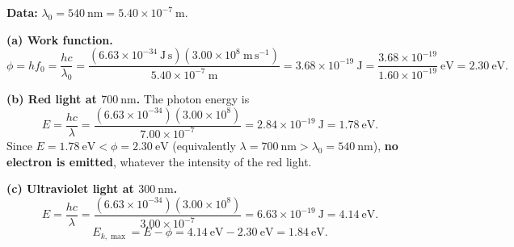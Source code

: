 \documentclass[11pt]{article}
\begin{document}
\begin{corrige}
\textbf{Data:} $\lambda_0 = 540\ \mathrm{nm} = 5.40\times 10^{-7}\ \mathrm{m}$.

\textbf{(a) Work function.}
\[ \phi = hf_0 = \frac{hc}{\lambda_0} = \frac{(6.63\times 10^{-34}\ \mathrm{J\,s})(3.00\times 10^{8}\ \mathrm{m\,s^{-1}})}{5.40\times 10^{-7}\ \mathrm{m}} = 3.68\times 10^{-19}\ \mathrm{J} = \frac{3.68\times 10^{-19}}{1.60\times 10^{-19}}\ \mathrm{eV} = 2.30\ \mathrm{eV}. \]

\textbf{(b) Red light at $700\ \mathrm{nm}$.} The photon energy is
\[ E = \frac{hc}{\lambda} = \frac{(6.63\times 10^{-34})(3.00\times 10^{8})}{7.00\times 10^{-7}} = 2.84\times 10^{-19}\ \mathrm{J} = 1.78\ \mathrm{eV}. \]
Since $E = 1.78\ \mathrm{eV} < \phi = 2.30\ \mathrm{eV}$ (equivalently $\lambda = 700\ \mathrm{nm} > \lambda_0 = 540\ \mathrm{nm}$), \textbf{no electron is emitted}, whatever the intensity of the red light.

\textbf{(c) Ultraviolet light at $300\ \mathrm{nm}$.}
\[ E = \frac{hc}{\lambda} = \frac{(6.63\times 10^{-34})(3.00\times 10^{8})}{3.00\times 10^{-7}} = 6.63\times 10^{-19}\ \mathrm{J} = 4.14\ \mathrm{eV}. \]
\[ E_{k,\max} = E - \phi = 4.14\ \mathrm{eV} - 2.30\ \mathrm{eV} = 1.84\ \mathrm{eV}. \]
\end{corrige}
\end{document}
